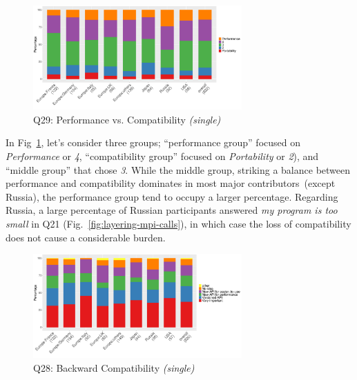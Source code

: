 \documentclass[preprint,5p,times]{elsarticle}
\def\myquote#1{{\it #1}}
\newcommand{\revision}[2]{{\color{blue}#2}}
\def\mcountries{major contributors\xspace{}}%
\begin{document}
\begin{figure}[tb]
\begin{center}
\includegraphics[width=8.0cm]{R-scripts/Q29.pdf}
\vspace{-1.5mm}
\caption{Q29: Performance vs. Compatibility {\it(single)}}
\label{fig:performance-vs-compatibility}
\vspace{-3mm}%
\end{center}
\end{figure}

In Fig~\ref{fig:performance-vs-compatibility}, let's consider three
groups; ``performance group'' focused on \myquote{Performance} or
  \myquote{4}, ``compatibility group'' focused on
    \myquote{Portability} or \myquote{2}), and ``middle group''
    \revision{who}{that} chose \myquote{3}. While the middle group,
    striking a balance
between performance and compatibility dominates in most \mcountries\ (\revision{excepting}{except}
Russia), the performance group tend to occupy a larger percentage. Regarding
Russia, a large percentage of Russian participants answered \myquote{my program
is too small} in Q21 (Fig.~\ref{fig:layering-mpi-calls}), in which case the loss
of compatibility does not cause a considerable burden.

\begin{figure}[tb]
\begin{center}
\includegraphics[width=8.0cm]{R-scripts/Q28.pdf}
\vspace{-1.5mm}
\caption{Q28: Backward Compatibility {\it(single)}}
\label{fig:compatibility}
\vspace{-3mm}%
\end{center}
\end{figure}
\end{document}
